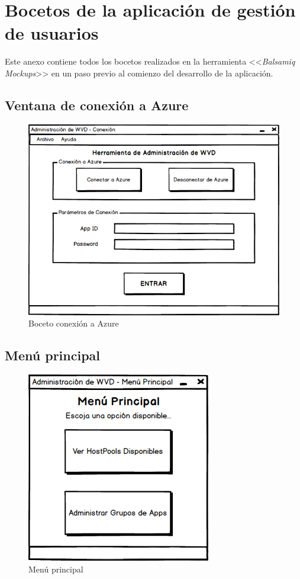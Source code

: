 \chapter{Bocetos de la aplicación de gestión de usuarios}
\label{anx:bocetos}

Este anexo contiene todos los bocetos realizados en la herramienta <<\textit{Balsamiq Mockups}>> en un paso previo al comienzo del desarrollo de la aplicación.

\section{Ventana de conexión a Azure}

\begin{figure}[h]
  \centering
  \includegraphics[width=0.9\linewidth]{figures/images/bocetos/conex_ampliado.png}
  \caption{Boceto conexión a Azure}
  \label{fig:b_conexAzure}
\end{figure}

\clearpage

\section{Menú principal}

\begin{figure}[h]
  \centering
  \includegraphics[width=0.4\linewidth]{figures/images/bocetos/menu.png}
  \caption{Menú principal}
  \label{fig:b_menu}
\end{figure}

